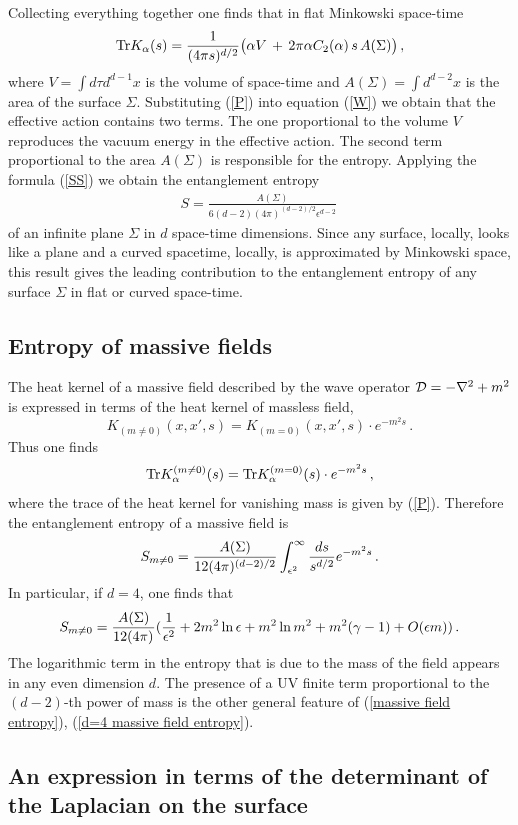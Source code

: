 \documentclass[12pt]{article}
\def\Tr{\hbox{Tr}}
\def\be{\begin{eqnarray}}
\def\ee{\end{eqnarray}}
\def\lb{\label}
\def\o{\over}
\begin{document}
Collecting everything together one finds that in flat Minkowski space-time
 \begin{equation}
  \Tr K_\alpha(s) =\frac1{(4\pi s)^{d/2}} \big( \alpha V 
   \, + \,2\pi \alpha C_2(\alpha)\, s\, A(\Sigma)\big)\, ,
 \lb{P}
 \end{equation}
where $V=\int d\tau d^{d-1}x$ is the volume of space-time and $A(\Sigma)=\int d^{d-2}x$ is the area of the surface $\Sigma$. Substituting (\ref{P}) into equation (\ref{W}) we obtain that the effective action contains two terms. The one proportional to the volume $V$ reproduces the vacuum energy in the effective action. The second term proportional to the area $A(\Sigma)$ is responsible for the entropy. Applying the formula (\ref{SS}) we obtain the entanglement entropy
 \be
  S=\frac{A(\Sigma)}{6 (d-2) (4\pi)^{(d-2)/2}\epsilon^{d-2}}\,
 \lb{Sent}
 \ee
 of an infinite plane $\Sigma$ in $d$ space-time dimensions.  Since any surface, locally, looks like a plane and a curved spacetime, locally, is approximated by Minkowski space, this result gives the leading 
 contribution to the entanglement entropy of any surface $\Sigma$ in flat or curved space-time.
 
\subsection{Entropy of massive fields}  
The heat kernel of a massive field described by the wave operator ${\cal D}=-\nabla^2 +m^2$ is expressed in terms of the heat kernel of massless field,
$$
K_{(m\neq 0)}(x,x',s)=K_{(m=0)}(x,x',s)\cdot e^{-m^2 s}\, .
$$
 Thus one finds
\be
\Tr K^{(m\neq 0)}_\alpha(s)=\Tr K^{(m=0)}_\alpha(s) \cdot e^{-m^2s}\, ,
\lb{trace massive field}
\ee
where the trace of the heat kernel for vanishing mass is given by (\ref{P}).
Therefore the entanglement entropy of a massive field is
\be
S_{m\neq 0}={A(\Sigma)\o  12 (4\pi)^{(d-2)/2}}\int_{\epsilon^2}^\infty {ds\o s^{d/2}}e^{-m^2s}\, .
\lb{massive field entropy}
\ee
In particular, if $d=4$, one finds that
\be
S_{m\neq 0}= {A(\Sigma)\o  12 (4\pi)^{}}({1\o \epsilon^2}+2m^2\ln\epsilon+m^2\ln m^2+m^2(\gamma-1) +O(\epsilon m))\, .
\lb{d=4 massive field entropy}
\ee
The logarithmic term in the entropy that is due to the mass of the field appears in any even dimension $d$. The presence of a UV finite term proportional to the $(d-2)$-th power of mass is the other general feature of (\ref{massive field entropy}), (\ref{d=4 massive field entropy}).
 

\subsection{An expression in terms of the determinant of the Laplacian on the surface}
\end{document}
